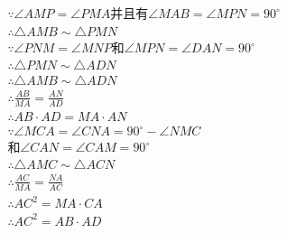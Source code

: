\documentclass[answers]{exam}
\begin{document}
\begin{questions}
	\begin{solution}
		\begin{align*}
			 & \because \angle{AMP} = \angle{PMA} \text{并且有} \angle{MAB} = \angle{MPN} = 90^\circ \\
			 & \therefore \triangle{AMB} \sim \triangle{PMN}                                      \\
			 & \because \angle{PNM} = \angle{MNP} \text{和} \angle{MPN} = \angle{DAN} = 90^\circ   \\
			 & \therefore \triangle{PMN} \sim \triangle{ADN}                                      \\
			 & \therefore \triangle{AMB} \sim \triangle{ADN}                                      \\
			 & \therefore \frac{AB}{MA} = \frac{AN}{AD}                                           \\
			 & \therefore AB\cdot AD = MA \cdot AN                                                \\
			 & \because \angle{MCA} = \angle{CNA} = 90^\circ - \angle{NMC}                        \\
			 & \text{和} \angle{CAN} = \angle{CAM} = 90^\circ                                      \\
			 & \therefore \triangle{AMC} \sim \triangle{ACN}                                      \\
			 & \therefore \frac{AC}{MA} = \frac{NA}{AC}                                           \\
			 & \therefore AC^2 = MA \cdot CA                                                      \\
			 & \therefore AC^2 = AB \cdot AD
		\end{align*}
	\end{solution}

\end{questions}
\end{document}
